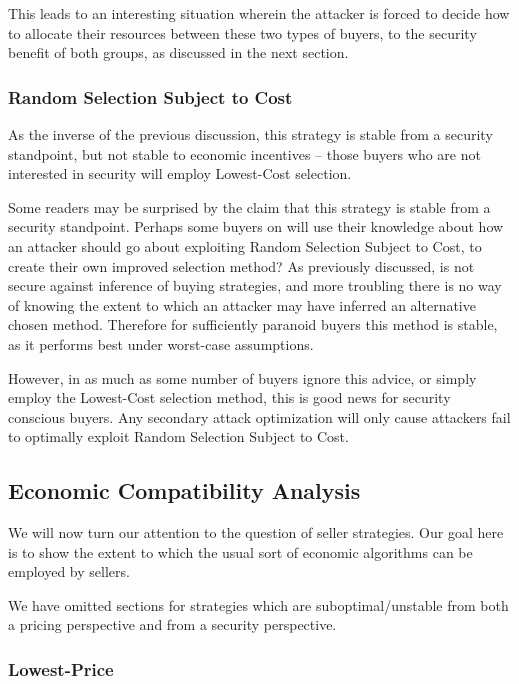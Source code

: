 This leads to an interesting situation wherein the attacker is forced
to decide how to allocate their resources between these two types of
buyers, to the security benefit of both groups, as discussed in the
next section.

\subsubsection{Random Selection Subject to Cost}

As the inverse of the previous discussion, this strategy is stable
from a security standpoint, but not stable to economic incentives --
those buyers who are not interested in security will employ
Lowest-Cost selection.

Some readers may be surprised by the claim that this strategy is
stable from a security standpoint. Perhaps some buyers on \tOM{} will
use their knowledge about how an attacker should go about exploiting
Random Selection Subject to Cost, to create their own improved
selection method? As previously discussed, \tOM{} is not secure
against inference of buying strategies, and more troubling there is no
way of knowing the extent to which an attacker may have inferred an
alternative chosen method. Therefore for sufficiently paranoid buyers
this method is stable, as it performs best under worst-case
assumptions.

However, in as much as some number of \tOM{} buyers ignore this
advice, or simply employ the Lowest-Cost selection method, this is
good news for security conscious buyers. Any secondary attack
optimization will only cause attackers fail to optimally exploit
Random Selection Subject to Cost.

\subsection{Economic Compatibility Analysis}

We will now turn our attention to the question of seller
strategies. Our goal here is to show the extent to which the usual
sort of economic algorithms can be employed by sellers.

We have omitted sections for strategies which are suboptimal/unstable
from both a pricing perspective and from a security perspective.

\subsubsection{Lowest-Price}

